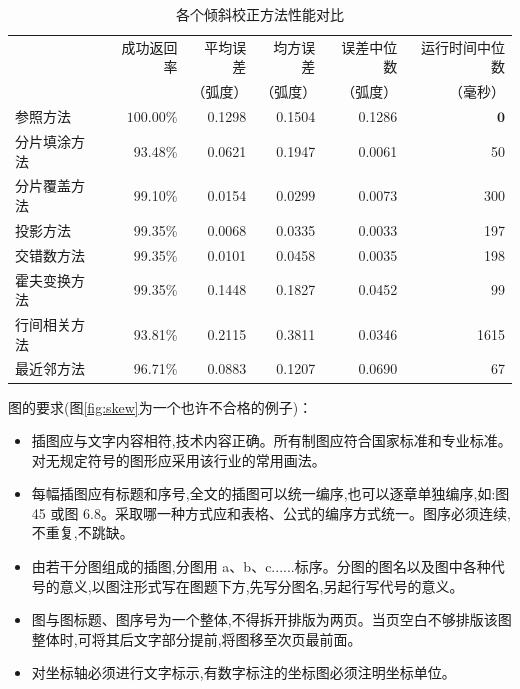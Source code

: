 \documentclass{sysuthesis}
\begin{document}
\begin{table}[hbp]
\caption{各个倾斜校正方法性能对比}
\centering
\begin{tabular}{lrrrrr}
\hline
& 成功返回率 & 平均误差& 均方误差& 误差中位数& 运行时间中位数\\
& & （弧度） & （弧度） & （弧度） & （毫秒）\\\hline
参照方法&$\mathbf{100.00\%}$&0.1298&0.1504&0.1286&$\mathbf{0}$\\
分片填涂方法&93.48\%&0.0621&0.1947&0.0061&50\\
分片覆盖方法&99.10\%&0.0154&$\mathbf{0.0299}$&0.0073&300\\
投影方法&99.35\%&$\mathbf{0.0068}$&0.0335&$\mathbf{0.0033}$&197\\
交错数方法&99.35\%&0.0101&0.0458&0.0035&198\\
霍夫变换方法&99.35\%&0.1448&0.1827&0.0452&99\\
行间相关方法&93.81\%&0.2115&0.3811&0.0346&1615\\
最近邻方法&96.71\%&0.0883&0.1207&0.0690&67\\\hline
\end{tabular}
\label{tab:skew}
\end{table}

图的要求(图\ref{fig:skew}为一个也许不合格的例子)：

\begin{itemize}
\item 插图应与文字内容相符,技术内容正确。所有制图应符合国家标准和专业标准。对无规定符号的图形应采用该行业的常用画法。
\item 每幅插图应有标题和序号,全文的插图可以统一编序,也可以逐章单独编序,如:图 45 或图 6.8。采取哪一种方式应和表格、公式的编序方式统一。图序必须连续,不重复,不跳缺。
\item 由若干分图组成的插图,分图用 a、b、c......标序。分图的图名以及图中各种代号的意义,以图注形式写在图题下方,先写分图名,另起行写代号的意义。
\item 图与图标题、图序号为一个整体,不得拆开排版为两页。当页空白不够排版该图整体时,可将其后文字部分提前,将图移至次页最前面。
\item 对坐标轴必须进行文字标示,有数字标注的坐标图必须注明坐标单位。
\end{itemize}
\end{document}
